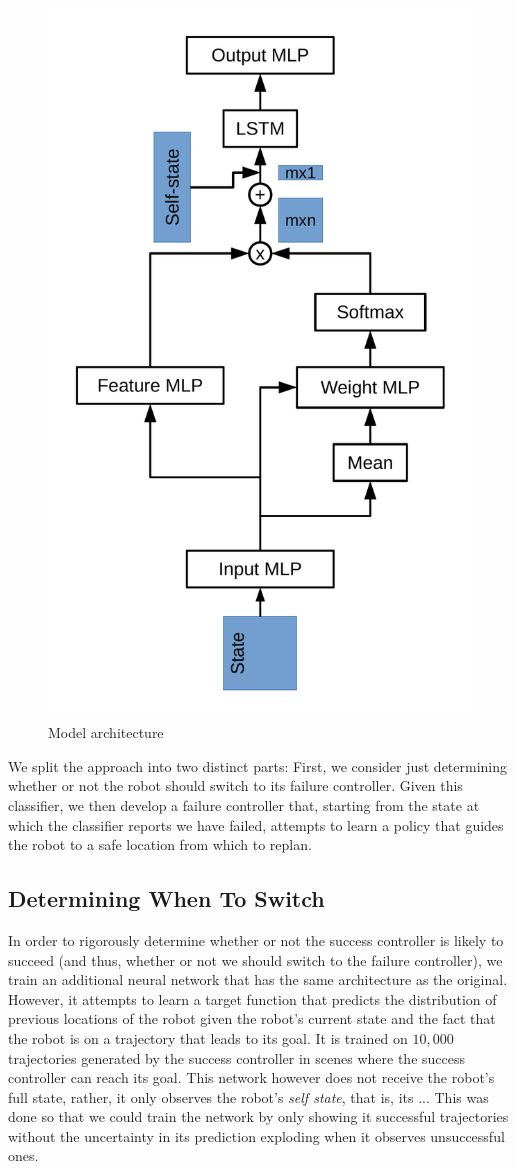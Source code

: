 \documentclass[letterpaper, 10 pt, conference]{ieeeconf}  %
\begin{document}
	\begin{figure}
		\centering
		\includegraphics[height=\linewidth, angle=270]{model_arch.pdf}
		\caption{Model architecture}
		\label{fig:model_arch}
	\end{figure}
	
	We split the approach into two distinct parts: First, we consider just determining whether or not the robot should switch to its failure controller. Given this classifier, we then develop a failure controller that, starting from the state at which the classifier reports we have failed, attempts to learn a policy that guides the robot to a safe location from which to replan.
	
	\subsection{Determining When To Switch}
		In order to rigorously determine whether or not the success controller is likely to succeed (and thus, whether or not we should switch to the failure controller), we train an additional neural network that has the same architecture as the original. However, it attempts to learn a target function that predicts the distribution of previous locations of the robot given the robot's current state and the fact that the robot is on a trajectory that leads to its goal. It is trained on $10,000$ trajectories generated by the success controller in scenes where the success controller can reach its goal. This network however does not receive the robot's full state, rather, it only observes the robot's \textit{self state}, that is, its ... This was done so that we could train the network by only showing it successful trajectories without the uncertainty in its prediction exploding when it observes unsuccessful ones. 
		
\end{document}
